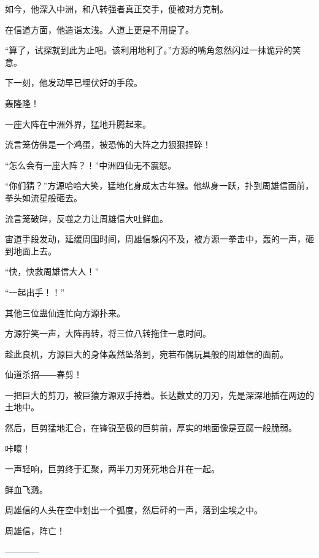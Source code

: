 \begin{this_body}
如今，他深入中洲，和八转强者真正交手，便被对方克制。

在信道方面，他造诣太浅。人道上更是不用提了。

“算了，试探就到此为止吧。该利用地利了。”方源的嘴角忽然闪过一抹诡异的笑意。

下一刻，他发动早已埋伏好的手段。

轰隆隆！

一座大阵在中洲外界，猛地升腾起来。

流言笼仿佛是一个鸡蛋，被恐怖的大阵之力狠狠捏碎！

“怎么会有一座大阵？！”中洲四仙无不震怒。

“你们猜？”方源哈哈大笑，猛地化身成太古年猴。他纵身一跃，扑到周雄信面前，拳头如流星般砸去。

流言笼破碎，反噬之力让周雄信大吐鲜血。

宙道手段发动，延缓周围时间，周雄信躲闪不及，被方源一拳击中，轰的一声，砸到地面上去。

“快，快救周雄信大人！”

“一起出手！！”

其他三位蛊仙连忙向方源扑来。

方源狞笑一声，大阵再转，将三位八转拖住一息时间。

趁此良机，方源巨大的身体轰然坠落到，宛若布偶玩具般的周雄信的面前。

仙道杀招――春剪！

一把巨大的剪刀，被巨猿方源双手持着。长达数丈的刀刃，先是深深地插在两边的土地中。

然后，巨剪猛地汇合，在锋锐至极的巨剪前，厚实的地面像是豆腐一般脆弱。

咔嚓！

一声轻响，巨剪终于汇聚，两半刀刃死死地合并在一起。

鲜血飞溅。

周雄信的人头在空中划出一个弧度，然后砰的一声，落到尘埃之中。

周雄信，阵亡！

------------

\end{this_body}

